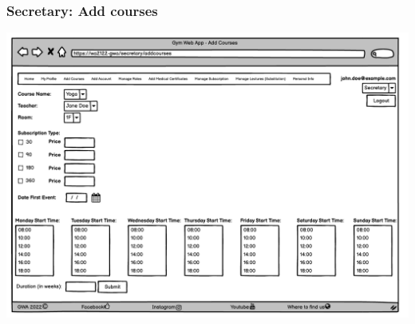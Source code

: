 \subsubsection{Secretary: Add courses}
\includegraphics[width=0.8\columnwidth]{InterfaceMockup/Secretary.pdf}

